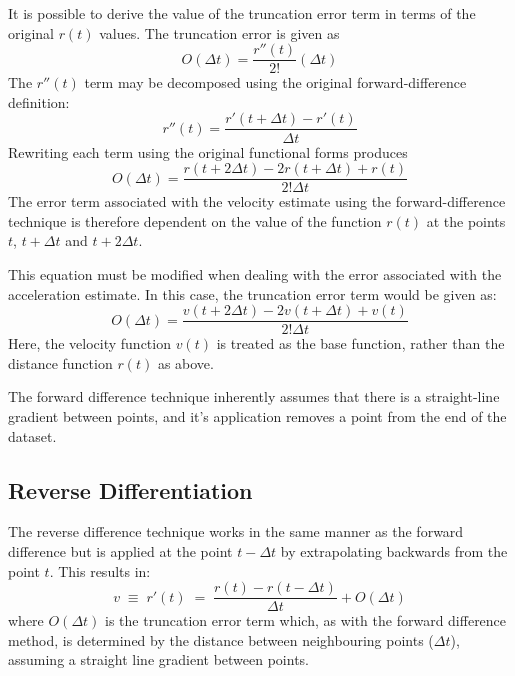 \documentclass[namedreferences]{SolarPhysics}
\begin{document}
\begin{article}
It is possible to derive the value of the truncation error term in terms of the original $r(t)$ values. The truncation error is given as
\begin{equation}
O(\Delta t) = \frac{r''(t)}{2!}(\Delta t)
\end{equation}
The $r''(t)$ term may be decomposed using the original forward-difference definition:
\begin{equation}
r''(t) = \frac{r'(t + \Delta t) - r'(t)}{\Delta t}
\end{equation}
Rewriting each term using the original functional forms produces
\begin{equation}
O(\Delta t) = \frac{r(t + 2\Delta t) - 2r(t + \Delta t) + r(t)}{2!\Delta t}
\end{equation}
The error term associated with the velocity estimate using the forward-difference technique is therefore dependent on the value of the function $r(t)$ at the points $t$, $t+\Delta t$ and $t+2\Delta t$.

This equation must be modified when dealing with the error associated with the acceleration estimate. In this case, the truncation error term would be given as:
\begin{equation}
O(\Delta t) = \frac{v(t + 2\Delta t) - 2v(t + \Delta t) + v(t)}{2!\Delta t}
\end{equation}
Here, the velocity function $v(t)$ is treated as the base function, rather than the distance function $r(t)$ as above. 

The forward difference technique inherently assumes that there is a straight-line gradient between points, and it's application removes a point from the end of the dataset.

\subsection{Reverse Differentiation}

The reverse difference technique works in the same manner as the forward difference but is applied at the point $t - \Delta t$ by extrapolating backwards from the point $t$. This results in:
\begin{equation}
v \; \equiv \; r'(t) \; = \; \frac{r(t ) - r(t - \Delta t)}{\Delta t} + O(\Delta t)
\end{equation}
where $O(\Delta t)$ is the truncation error term which, as with the forward difference method, is determined by the distance between neighbouring points ($\Delta t$), assuming a straight line gradient between points.


\end{article}
\end{document}
